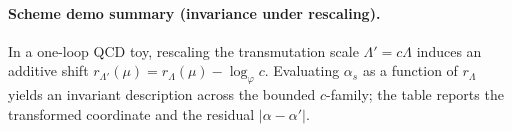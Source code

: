 \paragraph{Scheme demo summary (invariance under rescaling).}
\AuditTag In a one-loop QCD toy, rescaling the transmutation scale $\Lambda' = c\Lambda$ induces an additive shift $r_{\Lambda'}(\mu)=r_{\Lambda}(\mu)-\log_{\varphi}c$. Evaluating $\alpha_s$ as a function of $r_{\Lambda}$ yields an invariant description across the bounded $c$-family; the table reports the transformed coordinate and the residual $|\alpha-\alpha'|$.
